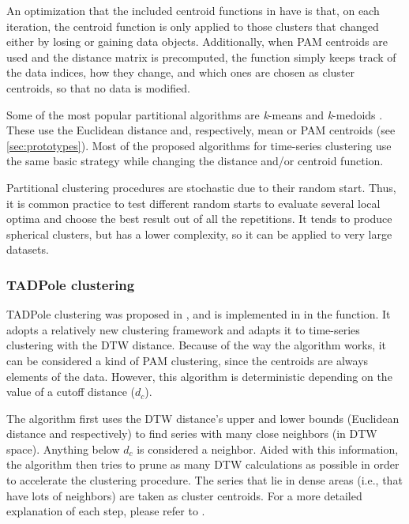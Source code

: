 An optimization that the included centroid functions in \dtwclust{} have is that,
on each iteration,
the centroid function is only applied to those clusters that changed either by losing or gaining data objects.
Additionally, when PAM centroids are used and the distance matrix is precomputed,
the function simply keeps track of the data indices,
how they change,
and which ones are chosen as cluster centroids,
so that no data is modified.

Some of the most popular partitional algorithms are \textit{k}-means and \textit{k}-medoids \citep{hastie2009}.
These use the Euclidean distance and, respectively, mean or PAM centroids (see \cref{sec:prototypes}).
Most of the proposed algorithms for time-series clustering use the same basic strategy while changing the distance and/or centroid function.

Partitional clustering procedures are stochastic due to their random start.
Thus, it is common practice to test different random starts to evaluate several local optima and choose the best result out of all the repetitions.
It tends to produce spherical clusters,
but has a lower complexity,
so it can be applied to very large datasets.

\subsubsection{TADPole clustering}
\label{sec:tadpole}

TADPole clustering was proposed in \citet{begum2015},
and is implemented in \dtwclust{} in the  function.
It adopts a relatively new clustering framework and adapts it to time-series clustering with the DTW distance.
Because of the way the algorithm works,
it can be considered a kind of PAM clustering,
since the centroids are always elements of the data.
However, this algorithm is deterministic depending on the value of a cutoff distance ($d_c$).

The algorithm first uses the DTW distance's upper and lower bounds (Euclidean distance and  respectively) to find series with many close neighbors (in DTW space).
Anything below $d_c$ is considered a neighbor.
Aided with this information,
the algorithm then tries to prune as many DTW calculations as possible in order to accelerate the clustering procedure.
The series that lie in dense areas (i.e., that have lots of neighbors) are taken as cluster centroids.
For a more detailed explanation of each step,
please refer to \citet{begum2015}.

